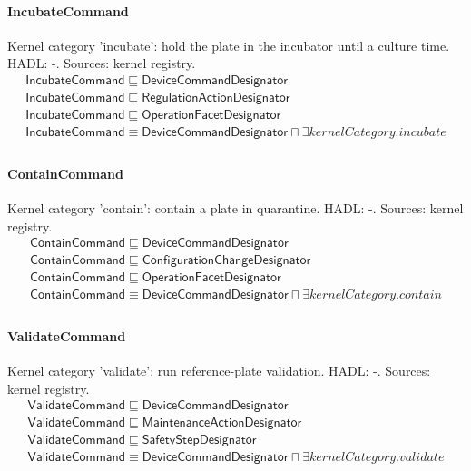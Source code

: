 \documentclass[10pt]{article}
\begin{document}
\paragraph{IncubateCommand} Kernel category 'incubate': hold the plate in the incubator until a culture time. HADL: -. Sources: kernel registry.
\[\begin{array}{l}
\mathsf{IncubateCommand} \sqsubseteq  \mathsf{DeviceCommandDesignator} \\
\mathsf{IncubateCommand} \sqsubseteq  \mathsf{RegulationActionDesignator} \\
\mathsf{IncubateCommand} \sqsubseteq  \mathsf{OperationFacetDesignator} \\
\mathsf{IncubateCommand} \equiv  \mathsf{DeviceCommandDesignator} \sqcap  \exists \mathit{kernelCategory}.{incubate} \\
\end{array}\]
\paragraph{ContainCommand} Kernel category 'contain': contain a plate in quarantine. HADL: -. Sources: kernel registry.
\[\begin{array}{l}
\mathsf{ContainCommand} \sqsubseteq  \mathsf{DeviceCommandDesignator} \\
\mathsf{ContainCommand} \sqsubseteq  \mathsf{ConfigurationChangeDesignator} \\
\mathsf{ContainCommand} \sqsubseteq  \mathsf{OperationFacetDesignator} \\
\mathsf{ContainCommand} \equiv  \mathsf{DeviceCommandDesignator} \sqcap  \exists \mathit{kernelCategory}.{contain} \\
\end{array}\]
\paragraph{ValidateCommand} Kernel category 'validate': run reference-plate validation. HADL: -. Sources: kernel registry.
\[\begin{array}{l}
\mathsf{ValidateCommand} \sqsubseteq  \mathsf{DeviceCommandDesignator} \\
\mathsf{ValidateCommand} \sqsubseteq  \mathsf{MaintenanceActionDesignator} \\
\mathsf{ValidateCommand} \sqsubseteq  \mathsf{SafetyStepDesignator} \\
\mathsf{ValidateCommand} \equiv  \mathsf{DeviceCommandDesignator} \sqcap  \exists \mathit{kernelCategory}.{validate} \\
\end{array}\]
\end{document}

